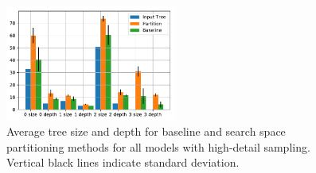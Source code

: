 \begin{figure}[htb]
	\centering
	\includegraphics[width=0.5\textwidth]{figures/g2.pdf}
	\caption{Average tree size and depth for baseline and search space partitioning methods for all models with high-detail sampling. Vertical black lines indicate standard deviation.}
	\label{fig:graph2}
\end{figure}

